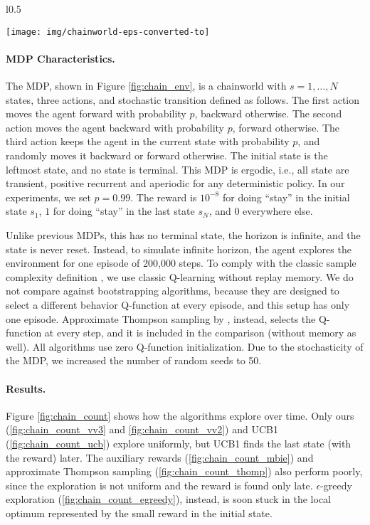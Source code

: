 \documentclass{article}
\begin{document}
\begin{wrapfigure}{l}{0.5\textwidth}
	\begin{center}
		\vspace*{-0.7cm}
		\texttt{[image: img/chainworld-eps-converted-to]}
	\end{center}
	\vspace*{-0.5cm}
	\caption{The ergodic chainworld.}
	\label{fig:chain_env}
	\vspace*{-10pt}
\end{wrapfigure}
\paragraph{MDP Characteristics.}
The MDP, shown in Figure \ref{fig:chain_env}, is a chainworld with $s = 1, \ldots, N$ states, three actions, and stochastic transition defined as follows. 
The first action moves the agent forward with probability $p$, backward otherwise. The second action moves the agent backward with probability $p$, forward otherwise. The third action keeps the agent in the current state with probability $p$, and randomly moves it backward or forward otherwise.
The initial state is the leftmost state, and no state is terminal.
This MDP is ergodic, i.e., all state are transient, positive recurrent and aperiodic for any deterministic policy.
In our experiments, we set $p = 0.99$.
The reward is $10^{-8}$ for doing ``stay'' in the initial state $s_1$, $1$ for doing ``stay'' in the last state $s_N$, and 0 everywhere else.

Unlike previous MDPs, this has no terminal state, the horizon is infinite, and the state is never reset. Instead, to simulate infinite horizon, the agent explores the environment for one episode of 200,000 steps. 
To comply with the classic sample complexity definition \citep{strehl2008analysis,dong2019q}, we use classic Q-learning without replay memory. We do not compare against bootstrapping algorithms, because they are designed to select a different behavior Q-function at every episode, and this setup has only one episode. Approximate Thompson sampling by \citet{deramo2019exploiting}, instead, selects the Q-function at every step, and it is included in the comparison (without memory as well). All algorithms use zero Q-function initialization. 
Due to the stochasticity of the MDP, we increased the number of random seeds to 50.


\paragraph{Results.}
Figure \ref{fig:chain_count} shows how the algorithms explore over time. Only ours (\ref{fig:chain_count_vv3} and \ref{fig:chain_count_vv2}) and UCB1 (\ref{fig:chain_count_ucb}) explore uniformly, but UCB1 finds the last state (with the reward) later. The auxiliary rewards (\ref{fig:chain_count_mbie}) and approximate Thompson sampling (\ref{fig:chain_count_thomp}) also perform poorly, since the exploration is not uniform and the reward is found only late.  $\epsilon$-greedy exploration (\ref{fig:chain_count_egreedy}), instead, is soon stuck in the local optimum represented by the small reward in the initial state.
\end{document}
